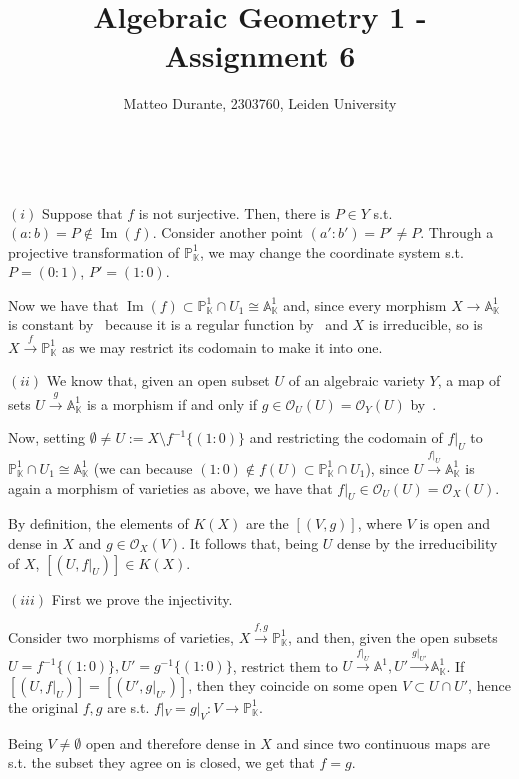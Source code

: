 \documentclass{article}
\newcommand{\numberset}{\mathbb}
\newcommand{\K}{\numberset{K}}
\newcommand{\A}{\mathbb{A}}
\newcommand{\Ps}{\mathbb{P}}
\newcommand{\exercise}[1]{\noindent {\bf Exercise #1}}
\DeclareMathOperator{\Ima}{Im}
\begin{document}
\title{Algebraic Geometry 1 - Assignment 6}

\author{Matteo Durante, 2303760, Leiden University}

\maketitle


~\\
\exercise{8.6.5}

$(i)$ Suppose that $f$ is not surjective. Then, there is $P\in Y$ s.t. $(a:b)=P\not\in\Ima(f)$. Consider another point $(a':b')=P'\neq P$. Through a projective transformation of $\Ps^1_{\K}$, we may change the coordinate system s.t. $P=(0:1)$, $P'=(1:0)$.

Now we have that $\Ima(f)\subset\Ps^1_{\K}\cap U_1\cong\A^1_{\K}$ and, since every morphism $X\rightarrow\A^1_{\K}$ is constant by~\cite[prop. 4.2.5]{edix} because it is a regular function by~\cite[prop. 4.3.11]{edix} and $X$ is irreducible, so is $X\xrightarrow{f}\Ps^1_{\K}$ as we may restrict its codomain to make it into one.

$(ii)$ We know that, given an open subset $U$ of an algebraic variety $Y$, a map of sets $U\xrightarrow{g}\A^1_{\K}$ is a morphism if and only if $g\in\mathcal{O}_U(U)=\mathcal{O}_Y(U)$ by~\cite[prop. 4.3.11]{edix}.

Now, setting $\emptyset\neq U:=X\setminus f^{-1}\{(1:0)\}$ and restricting the codomain of $f|_U$ to $\Ps^1_{\K}\cap U_1\cong\A^1_{\K}$ (we can because $(1:0)\not\in f(U)\subset\Ps^1_{\K}\cap U_1$), since $U\xrightarrow{f|_U}\A^1_{\K}$ is again a morphism of varieties as above, we have that $f|_U\in\mathcal{O}_U(U)=\mathcal{O}_X(U)$.

By definition, the elements of $K(X)$ are the $[(V,g)]$, where $V$ is open and dense in $X$ and $g\in\mathcal{O}_X(V)$. It follows that, being $U$ dense by the irreducibility of $X$, $[(U,f|_U)]\in K(X)$.

$(iii)$ First we prove the injectivity.

Consider two morphisms of varieties, $X\xrightarrow{f,g}\Ps^1_{\K}$, and then, given the open subsets $U=f^{-1}\{(1:0)\},U'=g^{-1}\{(1:0)\}$, restrict them to $U\xrightarrow{f|_U}\A^1,U'\xrightarrow{g|_{U'}}\A^1_{\K}$. If $[(U,f|_U)]=[(U',g|_{U'})]$, then they coincide on some open $V\subset U\cap U'$, hence the original $f,g$ are s.t. $f|_V=g|_V:V\rightarrow\Ps^1_{\K}$.

Being $V\neq\emptyset$ open and therefore dense in $X$ and since two continuous maps are s.t. the subset they agree on is closed, we get that $f=g$.
\end{document}
